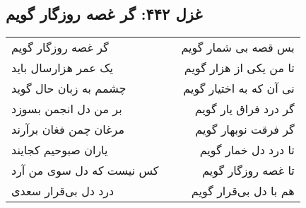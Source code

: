 \begin{center}
\section*{غزل ۴۴۲: گر غصه روزگار گویم}
\label{sec:442}
\begin{longtable}{l p{0.5cm} r}
گر غصه روزگار گویم
&&
بس قصه بی شمار گویم
\\
یک عمر هزارسال باید
&&
تا من یکی از هزار گویم
\\
چشمم به زبان حال گوید
&&
نی آن که به اختیار گویم
\\
بر من دل انجمن بسوزد
&&
گر درد فراق یار گویم
\\
مرغان چمن فغان برآرند
&&
گر فرقت نوبهار گویم
\\
یاران صبوحیم کجایند
&&
تا درد دل خمار گویم
\\
کس نیست که دل سوی من آرد
&&
تا غصه روزگار گویم
\\
درد دل بی‌قرار سعدی
&&
هم با دل بی‌قرار گویم
\\
\end{longtable}
\end{center}
